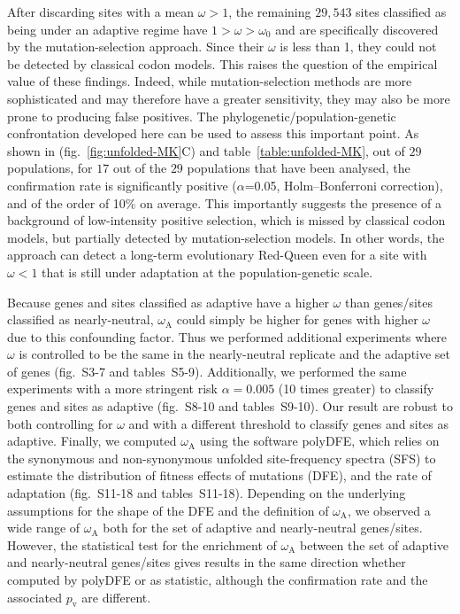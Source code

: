 \documentclass{article}
\newcommand{\rateApop}{\omega_{\mathrm{A}}}
\begin{document}
    After discarding sites with a mean $\omega > 1$, the remaining $29,543$ sites classified as being under an adaptive regime have $1 > \omega > \omega_{0}$ and are specifically discovered by the mutation-selection approach.
    Since their $\omega$ is less than 1, they could not be detected by classical codon models.
    This raises the question of the empirical value of these findings.
    Indeed, while mutation-selection methods are more sophisticated and may therefore have a greater sensitivity, they may also be more prone to producing false positives.
    The phylogenetic/population-genetic confrontation developed here can be used to assess this important point.
    As shown in (fig.~\ref{fig:unfolded-MK}C) and table~\ref{table:unfolded-MK}, out of $29$ populations, for $17$ out of the $29$ populations that have been analysed, the confirmation rate is significantly positive ($\alpha$=0.05, Holm–Bonferroni correction), and of the order of 10\% on average.
    This importantly suggests the presence of a background of low-intensity positive selection, which is missed by classical codon models, but partially detected by mutation-selection models.
    In other words, the approach can detect a long-term evolutionary Red-Queen even for a site with $\omega < 1$ that is still under adaptation at the population-genetic scale.

    Because genes and sites classified as adaptive have a higher $\omega$ than genes/sites classified as nearly-neutral, $\rateApop$ could simply be higher for genes with higher $\omega$ due to this confounding factor.
    Thus we performed additional experiments where $\omega$ is controlled to be the same in the nearly-neutral replicate and the adaptive set of genes (fig.~S3-7 and tables~S5-9).
    Additionally, we performed the same experiments with a more stringent risk $\alpha=0.005$ (10 times greater) to classify genes and sites as adaptive (fig.~S8-10 and tables~S9-10).
    Our result are robust to both controlling for $\omega$ and with a different threshold to classify genes and sites as adaptive.
    Finally, we computed $\rateApop$ using the software polyDFE\cite{tataru_polydfe_2020}, which relies on the synonymous and non-synonymous unfolded site-frequency spectra (SFS) to estimate the distribution of fitness effects of mutations (DFE), and the rate of adaptation (fig.~S11-18 and tables~S11-18).
    Depending on the underlying assumptions for the shape of the DFE and the definition of $\rateApop$, we observed a wide range of $\rateApop$ both for the set of adaptive and nearly-neutral genes/sites.
    However, the statistical test for the enrichment of $\rateApop$ between the set of adaptive and nearly-neutral genes/sites gives results in the same direction whether computed by polyDFE or as \textcite{mcdonald_adaptative_1991} statistic, although the confirmation rate and the associated $p_{\mathrm{v}}$ are different.
\end{document}
